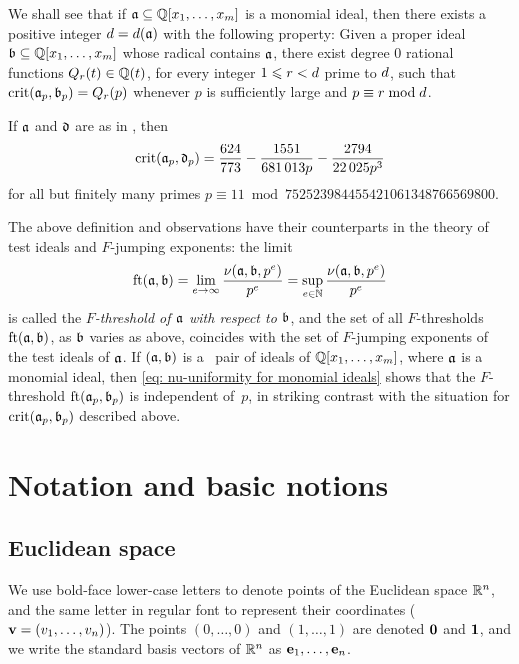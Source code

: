 \documentclass{amsart}
\begin{document}
We shall see that if $\mathfrak{a} \subseteq \mathbb{Q}[x_1,\ldots,x_m]$ is a monomial ideal, then there exists a positive integer $d = d(\mathfrak{a})$ with the following property:
Given a proper ideal $\mathfrak{b} \subseteq \mathbb{Q}[x_1,\ldots,x_m]$ whose radical contains $\mathfrak{a}$, there exist degree $0$ rational functions $Q_r(t) \in \mathbb{Q}(t)$, for every integer $1 \leqslant r < d$ prime to $d$, such that $\operatorname{crit}(\mathfrak{a}_p, \mathfrak{b}_p) = Q_r(p)$ whenever $p$ is sufficiently large and $p \equiv r \bmod d$.

\begin{example}
   If $\mathfrak{a}$ and $\mathfrak{d}$ are as in , then 
   \[
      \operatorname{crit}(\mathfrak{a}_p,\mathfrak{d}_p) =
      \frac{624}{773} - \frac{\num{1551}}{\num{681013} p} - \frac{\num{2794}}{\num{22025} p^3}
   \]
   for all but finitely many primes $p \equiv 11 \bmod \num{752523984455421061348766569800}$.
\end{example}

The above definition and observations have their counterparts in the theory of test ideals and $F$-jumping exponents: the limit
\[
   \operatorname{ft}(\mathfrak{a}, \mathfrak{b}) = \lim_{e\to \infty} \frac{\nu(\mathfrak{a},\mathfrak{b},p^e)}{p^e}
   = \sup_{e\in \mathbb{N}} \frac{\nu(\mathfrak{a},\mathfrak{b},p^e)}{p^e}
\]
is called the \emph{$F$-threshold of $\mathfrak{a}$ with respect to $\mathfrak{b}$}, and the set of all $F$-thresholds $\operatorname{ft}(\mathfrak{a}, \mathfrak{b})$, as $\mathfrak{b}$ varies as above, coincides with the set of $F$-jumping exponents of the test ideals of $\mathfrak{a}$.
If $(\mathfrak{a},\mathfrak{b})$ is a \compatible\ pair of ideals of  $\mathbb{Q}[x_1,\ldots,x_m]$, where $\mathfrak{a}$ is a monomial ideal, then \eqref{eq: nu-uniformity for monomial ideals} shows that the $F$-threshold $\operatorname{ft}(\mathfrak{a}_p, \mathfrak{b}_p)$ is independent of~$p$, in striking contrast with the situation for $\operatorname{crit}(\mathfrak{a}_p,\mathfrak{b}_p)$ described above.


\section{Notation and basic notions}

\subsection{Euclidean space}
\label{ss: euclidean spaces and convexity}
We use bold-face lower-case letters to denote points of the Euclidean space $\mathbb{R}^n$, and the same letter in regular font to represent their coordinates (\eg $\mathbf{v}=(v_1,\ldots,v_n)$).
The points $(0,\ldots,0)$ and $(1,\ldots,1)$ are denoted $\mathbf{0}$ and $\mathbf{1}$, and we write the standard basis vectors of $\mathbb{R}^n$ as $\mathbf{e}_1,\ldots,\mathbf{e}_n$.
\end{document}
